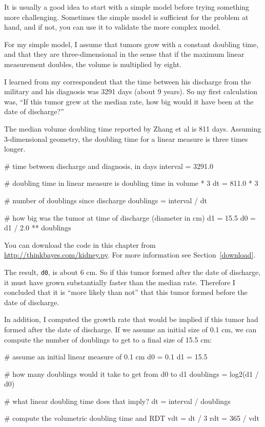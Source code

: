 \documentclass[12pt]{book}
\theoremstyle{exercise}
\begin{document}
It is usually a good idea to start with a simple model before
trying something more challenging.  Sometimes the simple model is
sufficient for the problem at hand, and if not, you can use it
to validate the more complex model.

For my simple model, I assume that tumors grow with a constant
doubling time, and that they are three-dimensional in the sense that
if the maximum linear measurement doubles, the volume is multiplied by
eight.

I learned from my correspondent that the time between his discharge
from the military and his diagnosis was 3291 days (about 9 years).
So my first calculation was, ``If this tumor grew at the median
rate, how big would it have been at the date of discharge?''

The median volume doubling time reported by Zhang et al is 811 days.
Assuming 3-dimensional geometry, the doubling time for a linear
measure is three times longer.

\begin{code}
    # time between discharge and diagnosis, in days 
    interval = 3291.0

    # doubling time in linear measure is doubling time in volume * 3
    dt = 811.0 * 3

    # number of doublings since discharge
    doublings = interval / dt

    # how big was the tumor at time of discharge (diameter in cm)
    d1 = 15.5
    d0 = d1 / 2.0 ** doublings
\end{code}

You can download the code in this chapter from
\url{http://thinkbayes.com/kidney.py}.  For more information
see Section~\ref{download}.

The result, {\tt d0}, is about 6 cm.  So if this tumor formed after
the date of discharge, it must have grown substantially faster than
the median rate.  Therefore I concluded that it is ``more likely than
not'' that this tumor formed before the date of discharge.

In addition, I computed the growth rate that would be implied
if this tumor had formed after the date of discharge.  If we
assume an initial size of 0.1 cm, we can compute the number of
doublings to get to a final size of 15.5 cm:

\begin{code}
    # assume an initial linear measure of 0.1 cm
    d0 = 0.1
    d1 = 15.5

    # how many doublings would it take to get from d0 to d1
    doublings = log2(d1 / d0)

    # what linear doubling time does that imply?
    dt = interval / doublings

    # compute the volumetric doubling time and RDT
    vdt = dt / 3
    rdt = 365 / vdt
\end{code}
\end{document}
